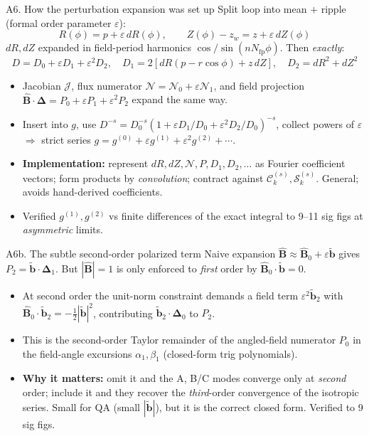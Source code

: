 \documentclass[aspectratio=169]{beamer}
\newcommand{\Del}{\bm{\Delta}}
\newcommand{\Bhat}{\hat{\bm{B}}}
\newcommand{\bperp}{\tilde{\bm{b}}}
\newcommand{\Nfp}{N_{\mathrm{fp}}}
\newcommand{\eps}{\varepsilon}
\newcommand{\Ck}[2]{\mathcal{C}^{(#2)}_{#1}}
\newcommand{\Sk}[2]{\mathcal{S}^{(#2)}_{#1}}
\begin{document}
\begin{frame}{A6. How the perturbation expansion was set up}
  \small
  Split loop into mean $+$ ripple (formal order parameter $\eps$):
  \begin{equation*}
    R(\phi)=p+\eps\,dR(\phi),\qquad Z(\phi)-z_w=z+\eps\,dZ(\phi)
  \end{equation*}
  $dR,dZ$ expanded in field-period harmonics $\cos/\sin(n\Nfp\phi)$. Then \emph{exactly}:
  \begin{equation*}
    D=D_0+\eps D_1+\eps^2 D_2,\quad
    D_1=2[dR(p-r\cos\phi)+z\,dZ],\quad D_2=dR^2+dZ^2
  \end{equation*}
  \begin{itemize}
    \item Jacobian $\mathcal{J}$, flux numerator $\mathcal{N}=\mathcal{N}_0+\eps\mathcal{N}_1$, and
      field projection $\Bhat\cdot\Del=P_0+\eps P_1+\eps^2 P_2$ expand the same way.
    \item Insert into $g$, use $D^{-s}=D_0^{-s}(1+\eps D_1/D_0+\eps^2 D_2/D_0)^{-s}$, collect powers
      of $\eps$ $\Rightarrow$ strict series $g=g^{(0)}+\eps g^{(1)}+\eps^2 g^{(2)}+\cdots$.
    \item \textbf{Implementation:} represent $dR,dZ,\mathcal{N},P,D_1,D_2,\ldots$ as Fourier
      coefficient vectors; form products by \emph{convolution}; contract against
      $\Ck{k}{s},\Sk{k}{s}$. General; avoids hand-derived coefficients.
    \item Verified $g^{(1)},g^{(2)}$ vs finite differences of the exact integral to 9--11 sig figs
      at \emph{asymmetric} limits.
  \end{itemize}
\end{frame}

\begin{frame}{A6b. The subtle second-order polarized term}
  \small
  Naive expansion $\Bhat\approx\Bhat_0+\eps\bperp$ gives $P_2=\bperp\cdot\Del_1$. But
  $|\Bhat|=1$ is only enforced to \emph{first} order by $\Bhat_0\cdot\bperp=0$.
  \begin{itemize}
    \item At second order the unit-norm constraint demands a field term $\eps^2\bperp_2$ with
      $\Bhat_0\cdot\bperp_2=-\tfrac12|\bperp|^2$, contributing $\bperp_2\cdot\Del_0$ to $P_2$.
    \item This is the second-order Taylor remainder of the angled-field numerator $P_0$ in the
      field-angle excursions $\alpha_1,\beta_1$ (closed-form trig polynomials).
    \item \textbf{Why it matters:} omit it and the A, B/C modes converge only at \emph{second}
      order; include it and they recover the \emph{third}-order convergence of the isotropic series.
      Small for QA (small $|\bperp|$), but it is the correct closed form. Verified to 9 sig figs.
  \end{itemize}
\end{frame}
\end{document}
